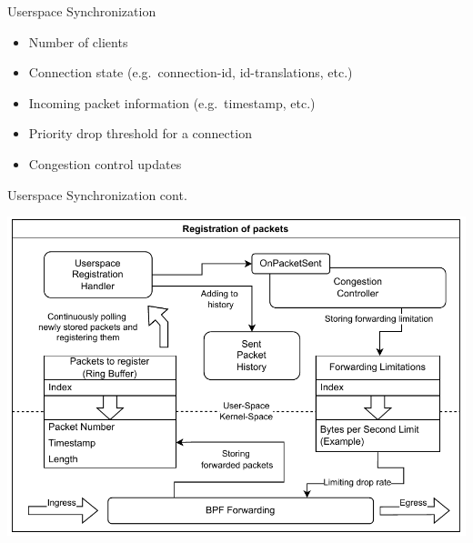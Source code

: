\documentclass[shortpres,aspectratio=43]{beamer}
\newlength{\mylength}
\begin{document}
\begin{frame}{Userspace Synchronization}
    \begin{minipage}{\textwidth}
        \begin{itemize}
            \item Number of clients
            \vspace{2\mylength}
            \item Connection state (e.g.~connection-id, id-translations, etc.)
            \vspace{2\mylength}
            \item Incoming packet information (e.g.~timestamp, etc.)
            \vspace{2\mylength}
            \item Priority drop threshold for a connection
            \vspace{2\mylength}
            \item Congestion control updates
        \end{itemize}
    \end{minipage}
\end{frame}

\begin{frame}{Userspace Synchronization cont.}
    \begin{minipage}{\textwidth}
        \centering
        \includegraphics[scale=0.6]{../figures/03_fast_relays/forward-registration.drawio.pdf}
    \end{minipage}
\end{frame}

\iffalse%
\end{document}
